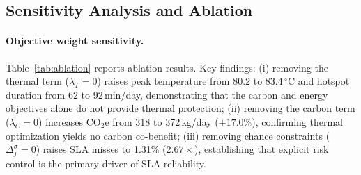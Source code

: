 \documentclass[a4paper,fleqn]{cas-dc}
\begin{document}
\subsection{Sensitivity Analysis and Ablation}
\label{sec:sensitivity}

\paragraph{Objective weight sensitivity.}
Table~\ref{tab:ablation} reports ablation results. Key findings: (i) removing the thermal term ($\lambda_T=0$) raises peak temperature from 80.2 to 83.4$\,^\circ$C and hotspot duration from 62 to 92\,min/day, demonstrating that the carbon and energy objectives alone do not provide thermal protection; (ii) removing the carbon term ($\lambda_C=0$) increases CO$_2$e from 318 to 372\,kg/day ($+17.0\%$), confirming thermal optimization yields no carbon co-benefit; (iii) removing chance constraints ($\Delta^\sigma_j=0$) raises SLA misses to 1.31\% ($2.67\times$), establishing that explicit risk control is the primary driver of SLA reliability.

\begin{table}[!htb]
\centering
\caption{Ablation study: effect of removing each component on key metrics (means over 5 runs). SustainSched-MPC (shaded) is the full system; each row removes exactly one component. \textbf{Bold} = best per column.}
\label{tab:ablation}
\setlength{\tabcolsep}{5pt}
\renewcommand{\arraystretch}{1.3}
\scriptsize
{}%
\end{table}
\end{document}
